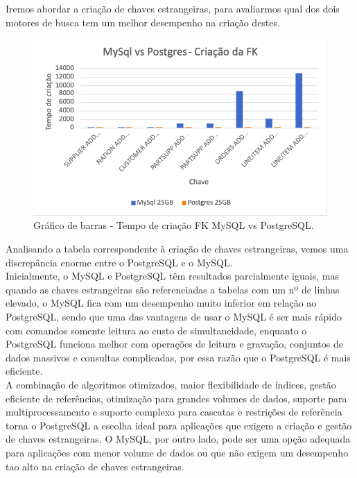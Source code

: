 \documentclass{article}
\begin{document}
\quad Iremos abordar a criação de chaves estrangeiras, para avaliarmos qual dos dois motores de busca tem um melhor desempenho na criação destes.\\


\begin{figure}[H]
  \centering
  \includegraphics[width=\textwidth]{Graphs/FKCreation.png}
  \caption{Gráfico de barras - Tempo de criação FK MySQL vs PostgreSQL.}
  \label{fig:PKCreation2}
\end{figure}

Analisando a tabela correspondente à criação de chaves estrangeiras, vemos uma discrepância enorme entre o PostgreSQL e o MySQL.\\

Inicialmente, o MySQL e PostgreSQL têm resultados parcialmente iguais, mas quando as chaves estrangeiras são referenciadas a tabelas com um nº de linhas elevado, o MySQL fica com um desempenho muito inferior em relação ao PostgreSQL, sendo que uma das vantagens de usar o MySQL é  ser mais rápido com comandos somente leitura ao custo de simultaneidade, enquanto o PostgreSQL funciona melhor com operações de leitura e gravação, conjuntos de dados massivos e consultas complicadas, por essa razão que o PostgreSQL é mais eficiente.\\

A combinação de algoritmos otimizados, maior flexibilidade de índices, gestão eficiente de referências, otimização para grandes volumes de dados, suporte para multiprocessamento e suporte complexo para cascatas  e restrições de referência torna o PostgreSQL a escolha ideal para aplicações que exigem a criação e gestão de chaves estrangeiras. O MySQL, por outro lado, pode ser uma opção adequada para aplicações com menor volume de dados ou que não exigem um desempenho tao alto na criação de chaves estrangeiras.\\
\end{document}
